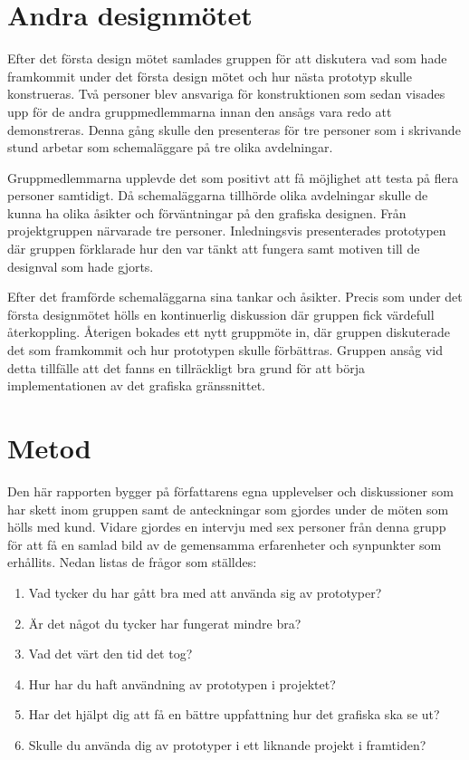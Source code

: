 \section{Andra designmötet}
Efter det första design mötet samlades gruppen för att diskutera vad som hade framkommit under det första design mötet och hur nästa prototyp skulle konstrueras. Två personer blev ansvariga för konstruktionen som sedan visades upp för de andra gruppmedlemmarna innan den ansågs vara redo att demonstreras. Denna gång skulle den presenteras för tre personer som i skrivande stund arbetar som schemaläggare på tre olika avdelningar. 

Gruppmedlemmarna upplevde det som positivt att få möjlighet att testa på flera personer samtidigt. Då schemaläggarna tillhörde olika avdelningar skulle de kunna ha olika åsikter och förväntningar på den grafiska designen. Från projektgruppen närvarade tre personer. Inledningsvis presenterades prototypen där gruppen förklarade hur den var tänkt att fungera samt motiven till de designval som hade gjorts. 

Efter det framförde schemaläggarna sina tankar och åsikter. Precis som under det första designmötet hölls en kontinuerlig diskussion där gruppen fick värdefull återkoppling. Återigen bokades ett nytt gruppmöte in, där gruppen diskuterade det som framkommit och hur prototypen skulle förbättras. Gruppen ansåg vid detta tillfälle att det fanns en tillräckligt bra grund för att börja implementationen av det grafiska gränssnittet.
  
\section{Metod}
Den här rapporten bygger på författarens egna upplevelser och diskussioner som har skett inom gruppen samt de anteckningar som gjordes under de möten som hölls med kund. Vidare gjordes en intervju med sex personer från denna grupp för att få en samlad bild av de gemensamma erfarenheter och synpunkter som erhållits. Nedan listas de frågor som ställdes:
\begin{enumerate}
	\item Vad tycker du har gått bra med att använda sig av prototyper?
 	\item Är det något du tycker har fungerat mindre bra?
 	\item Vad det värt den tid det tog?
 	\item Hur har du haft användning av prototypen i projektet?
 	\item Har det hjälpt dig att få en bättre uppfattning hur det grafiska ska se ut?
 	\item Skulle du använda dig av prototyper i ett liknande projekt i framtiden? 
\end{enumerate}
 
